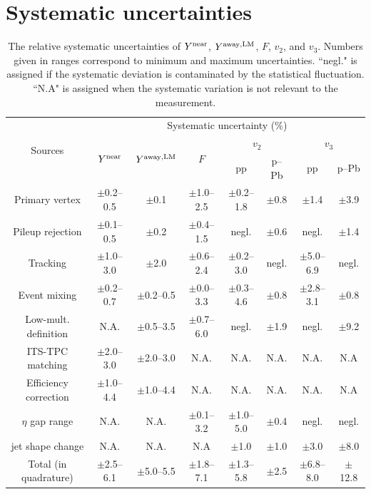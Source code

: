 
\section{Systematic uncertainties}
\label{sec:uncertainties}

\begin{table}[h!]
\caption{The relative systematic uncertainties of $Y^{\rm{near}}$, $Y^{\rm{away,LM}}$, $F$, $v_{2}$, and $v_{3}$. Numbers given in ranges correspond to minimum and maximum uncertainties. ``negl." is assigned if the systematic deviation is contaminated by the statistical fluctuation. ``N.A" is assigned when the systematic variation is not relevant to the measurement. }
\centering
\label{tab:syst}
\resizebox{\textwidth}{!} {
\begin{tabular}{c|ccccccc}
\hline 
\multirow{3}{*}{Sources}  & \multicolumn{7}{c}{Systematic uncertainty (\%)} \\ \cline{2-8} 
& \multirow{2}{*}{$Y^{\rm{near}}$} & \multirow{2}{*}{$Y^{\rm{away,LM}}$} & \multirow{2}{*}{$F$} & \multicolumn{2}{c}{$v_{2}$} & \multicolumn{2}{c}{$v_{3}$}  \\   \cline{5-8}
& & & & pp & p--Pb & pp & p--Pb  \\ \cline{1-8} 
Primary vertex       & $\pm$0.2--0.5 & $\pm$0.1      & $\pm$1.0--2.5 & $\pm$0.2--1.8 & $\pm$0.8 & $\pm$1.4 & $\pm$3.9 \\ 
Pileup rejection     & $\pm$0.1--0.5 & $\pm$0.2      & $\pm$0.4--1.5 & negl.         & $\pm$0.6 & negl. & $\pm$1.4 \\ 
Tracking		     & $\pm$1.0--3.0 & $\pm$2.0      & $\pm$0.6--2.4 & $\pm$0.2--3.0 & negl. & $\pm$5.0--6.9 & negl. \\ 
Event mixing	     & $\pm$0.2--0.7 & $\pm$0.2--0.5 & $\pm$0.0--3.3 & $\pm$0.3--4.6 & $\pm$0.8 & $\pm$2.8--3.1 & $\pm$0.8 \\ 
Low-mult. definition & N.A.          & $\pm$0.5--3.5 & $\pm$0.7--6.0 & negl.         & $\pm$1.9 & negl. & $\pm$9.2\\ 
ITS-TPC matching 	 & $\pm$2.0--3.0 & $\pm$2.0--3.0 & N.A.          & N.A.          & N.A. & N.A. & N.A\\ 
Efficiency correction& $\pm$1.0--4.4 & $\pm$1.0--4.4 & N.A.          & N.A.          & N.A. & N.A. & N.A\\ 
$\eta$ gap range   	 & N.A.          & N.A.          & $\pm$0.1--3.2 & $\pm$1.0--5.0 & $\pm$0.4 & negl. & negl. \\ 
jet shape change   	 & N.A.          & N.A.          & N.A &  $\pm$1.0& $\pm$1.0 & $\pm$3.0 & $\pm$8.0 \\ 
\hline 
Total (in quadrature)& $\pm$2.5--6.1 & $\pm$5.0--5.5 & $\pm$1.8--7.1 & $\pm$1.3--5.8 & $\pm$2.5 & $\pm$6.8--8.0 & $\pm$12.8 \\ 
\hline 
\end{tabular}
}
\end{table}

